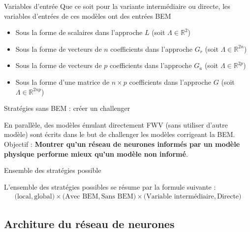 \documentclass[
11pt,notheorems,hyperref={pdfauthor=whatever}
]{beamer}
\begin{document}
\begin{frame}{Variables d'entrée}
    Que ce soit pour la variante intermédiaire ou directe, les variables d'entrées de ces modèles ont des entrées BEM 
    \begin{itemize}
        \item Sous la forme de scalaires dans l'approche $L$ (soit $ \Lambda \in \mathbb{R}^2$)
        \item Sous la forme de vecteurs de $n$ coefficients dans l'approche $G_r$ (soit $ \Lambda \in \mathbb{R}^{2n}$)
        \item Sous la forme de vecteurs de $p$ coefficients dans l'approche $G_a$ (soit $ \Lambda \in \mathbb{R}^{2p}$)
        \item Sous la forme d'une matrice de $n \times p$ coefficients dans l'approche $G$ (soit $ \Lambda \in \mathbb{R}^{2np}$)
    \end{itemize}
\end{frame}

\begin{frame}{Stratégies sans BEM : créer un challenger}
    \begin{center}
    En parallèle, des modèles émulant directement FWV (sans utiliser d'autre modèle) sont écrits dans le but de challenger les modèles corrigeant la BEM.\\ 
    Objectif : \textbf{Montrer qu'un réseau de neurones informés par un modèle physique performe mieux qu'un modèle non informé}.
    \end{center}
\end{frame}

\begin{frame}{Ensemble des stratégies possible}
    \begin{center}
        L'ensemble des stratégies possibles se résume par la formule suivante : 
        \begin{align*}
            \bigl(\text{local}, \text{global}\bigr) \times \bigl(\text{Avec BEM}, \text{Sans BEM}\bigr) \times \bigl(\text{Variable intermédiaire}, \text{Directe}\bigr)
        \end{align*}
    \end{center}
\end{frame}


\subsection{Architure du réseau de neurones}
\end{document}
